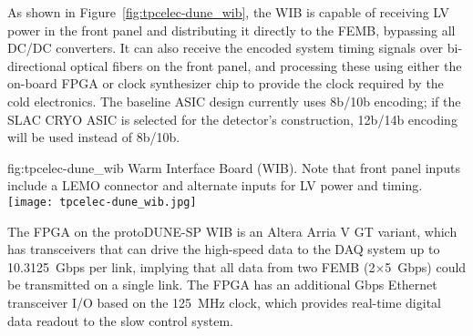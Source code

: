 As shown in Figure~\ref{fig:tpcelec-dune_wib}, the WIB is capable of receiving LV power in the front panel and distributing it directly to the FEMB, bypassing all DC/DC converters.
It can also receive the encoded system timing signals over bi-directional optical
fibers on the front panel, and processing these using either
the on-board FPGA or clock synthesizer chip to provide the clock required by the cold electronics.
The baseline ASIC design currently uses 8b/10b encoding; if the SLAC CRYO ASIC is selected for
the detector's construction, 12b/14b encoding will be used instead of 8b/10b.

\begin{dunefigure}
{fig:tpcelec-dune_wib}
{Warm Interface Board (WIB). Note that front panel inputs include a LEMO connector and alternate inputs for LV power and timing.}
\texttt{[image: tpcelec-dune\_wib.jpg]}
\end{dunefigure}

The FPGA on the protoDUNE-SP WIB is an Altera Arria V GT variant, which has
transceivers that can drive the high-speed data to the DAQ system up to
10.3125~Gbps per link, implying that all data from
two FEMB (2$\times$5~Gbps) could be transmitted on a single link.
The FPGA has an additional Gbps Ethernet transceiver I/O based on the 125~MHz clock, which 
provides real-time digital data readout to the slow control system.
